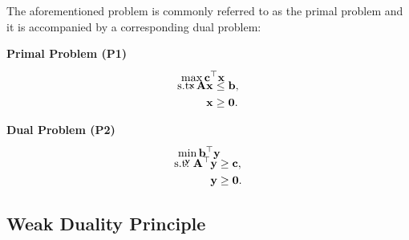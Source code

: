 \documentclass[twoside]{article}
\begin{document}
The aforementioned problem is commonly referred to as the primal problem and it
is accompanied by a corresponding dual problem:
\begin{center}
    \begin{minipage}[t]{0.35\textwidth}
        \centering
        \textbf{Primal Problem (P1)}
        \vspace{-0.5cm}
        \begin{align*}
            \intertext{
                $\displaystyle \max_{\mathbf{x}}
                    \mathbf{c}^\top \mathbf{x}$
                \vspace{-0.5cm}
            }
            \text{s.t.}\ \mathbf{Ax} &\leq \mathbf{b}, \\
                               \mathbf{x} &\geq \mathbf{0}.
        \end{align*}
    \end{minipage}%
    \begin{minipage}[t]{0.35\textwidth}
        \centering
        \textbf{Dual Problem (P2)}
        \vspace{-0.5cm}
        \begin{align*}
            \intertext{
                $\displaystyle \min_{\mathbf{y}}
                    \mathbf{b}^\top \mathbf{y}$
                \vspace{-0.5cm}
            }
            \text{s.t.}\ \mathbf{A}^\top \mathbf{y} &\geq \mathbf{c}, \\
                                              \mathbf{y} &\geq \mathbf{0}.
        \end{align*}
    \end{minipage}
\end{center}

\subsection{Weak Duality Principle}
\end{document}
